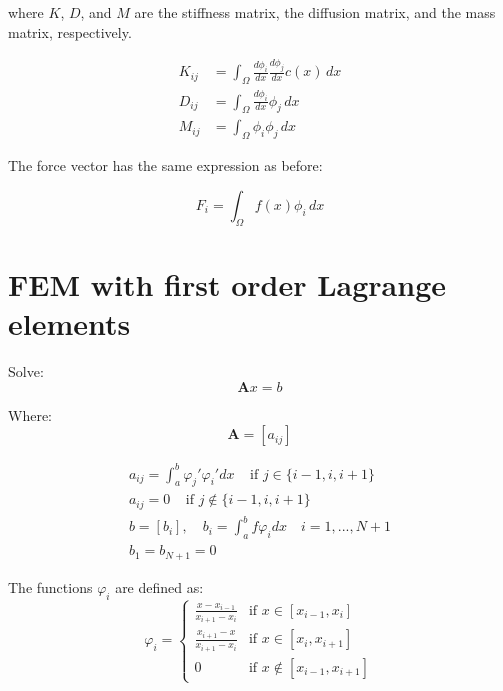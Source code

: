 \documentclass{article}
\begin{document}
where $K$, $D$, and $M$ are the stiffness matrix, the diffusion matrix, and the mass matrix, respectively. 

\begin{align*}
    K_{ij} &= \int_{\Omega} \frac{d \phi_i}{dx} \frac{d \phi_j}{dx} c(x) \, dx \\
    D_{ij} &= \int_{\Omega} \frac{d \phi_i}{dx} \phi_j \, dx \\
    M_{ij} &= \int_{\Omega} \phi_i \phi_j \, dx 
\end{align*}

The force vector has the same expression as before:

\begin{equation}
    F_i = \int_{\Omega} f(x) \phi_i \, dx
\end{equation}


\section{FEM with first order Lagrange elements}
\noindent Solve:
\begin{equation*}
    \textbf{A}x=b
\end{equation*}

\noindent Where:
\begin{equation*}
    \textbf{A}=[a_{ij}]
\end{equation*}

\begin{equation}
\begin{gathered}
     a_{ij}=\int_a^b \varphi_j' \varphi_i' dx \;\;\;\;\text{if } j\in\{ i-1,i,i+1\}  \\
     a_{ij}=0 \;\;\;\;\text{if } j\notin\{ i-1,i,i+1\} \\
     b=[b_i], \quad b_{i}=\int_a^b f \varphi_i dx \quad
     i=1,...,N+1 \\
     b_1 = b_{N+1} = 0 
\end{gathered}
\end{equation}



\noindent The functions $\varphi_i$ are defined as:
\[\varphi_i= \left\{
\begin{array}{rcl}
\frac{x-x_{i-1}}{x_{i+1}-x_{i}}& \text{if } x\in [x_{i-1}, x_i]\\
\frac{x_{i+1}-x}{x_{i+1}-x_{i}}& \text{if } x\in [x_{i}, x_{i+1}]\\
0& \text{if } x\notin [x_{i-1}, x_{i+1}]
\end{array}\right.\]
\end{document}
